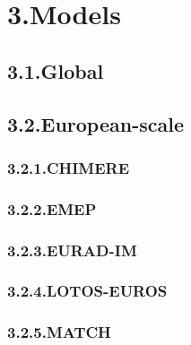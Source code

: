 \documentclass[9pt]{report}
\begin{document}
\section{3.\hspace*{0.5em}Models}\label{sec-models}%

\subsection{3.1.\hspace*{0.5em}Global}\label{sec-global}%

\subsection{3.2.\hspace*{0.5em}European-scale}\label{sec-european-scale}%

\subsubsection{3.2.1.\hspace*{0.5em}CHIMERE}\label{sec-chimere}%

\subsubsection{3.2.2.\hspace*{0.5em}EMEP}\label{sec-emep}%

\subsubsection{3.2.3.\hspace*{0.5em}EURAD-IM}\label{sec-eurad-im}%

\subsubsection{3.2.4.\hspace*{0.5em}LOTOS-EUROS}\label{sec-lotos-euros}%

\subsubsection{3.2.5.\hspace*{0.5em}MATCH}\label{sec-match}%
\end{document}
